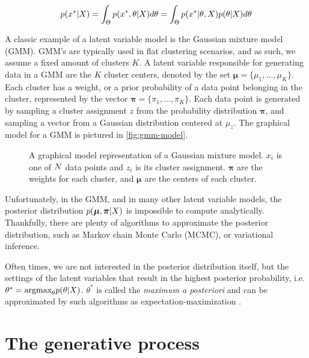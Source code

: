 \begin{align}
  p(x^* | X) = \int_\Theta p(x^*, \theta | X)d\theta =  \int_\Theta p(x^* | \theta, X)p(\theta | X)d\theta
\end{align}


A classic example of a latent variable model
is the Gaussian mixture model (GMM).
GMM's are typically used in flat clustering scenarios,
and as such, we assume a fixed amount of clusters $K$.
A latent variable responsible for generating
data in a GMM are
the $K$ cluster centers, denoted by the set
$\bm{\mu} = \{\mu_1, \ldots, \mu_K\}$.
Each cluster has a weight, or a prior probability
of a data point belonging in the cluster,
represented by the vector $\bm{\pi} = \{\pi_1,\ldots,\pi_K\}$.
Each data point is generated by sampling a cluster
assignment $z$ from the probability distribution $\bm{\pi}$,
and sampling a vector from a Gaussian distribution
centered at $\mu_z$.
The graphical model for a GMM is pictured in \autoref{fig:gmm-model}.

\begin{figure}[H]
  \centering
  
  \caption{A graphical model representation of a Gaussian mixture model. $x_i$ is
  one of $N$ data points and $z_i$ is its cluster assignment. $\bm{\pi}$ are the weights
  for each cluster, and $\bm{\mu}$ are the centers of each cluster.}
\label{fig:gmm-model}
\end{figure}

Unfortunately, in the GMM,
and in many other latent variable models,
the posterior distribution $p(\bm{\mu}, \bm{\pi} | X)$
is impossible to compute analytically.
Thankfully, there are plenty of
algorithms to approximate the posterior distribution,
such as
Markov chain
Monte Carlo (MCMC), or variational
inference.

Often times, we are not interested in the posterior
distribution itself, but the settings of the latent variables
that result in the highest posterior probability, i.e.
$\theta^* = \text{argmax}_\theta p(\theta | X)$.
$\theta^*$ is called the \emph{maximum a posteriori}
and can be approximated 
by such algorithms as
expectation-maximization \citep{Dempster1977}.
\fi

\section{The generative process}


